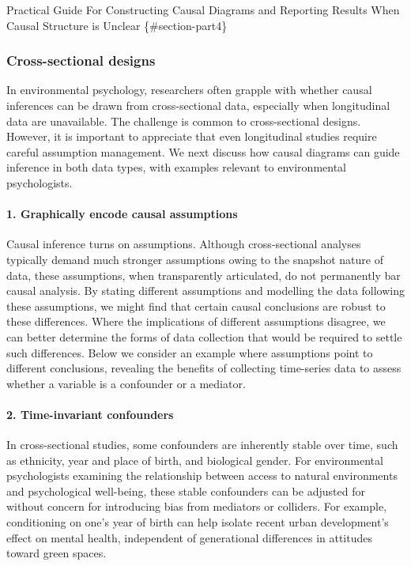 \documentclass[
  single column]{article}
\let\oldparagraph\paragraph
\renewcommand{\paragraph}[1]{\oldparagraph{#1}\mbox{}}
\begin{document}
Practical Guide For Constructing Causal Diagrams and Reporting Results
When Causal Structure is Unclear \{\#section-part4\}

\subsubsection{Cross-sectional designs}\label{cross-sectional-designs}

In environmental psychology, researchers often grapple with whether
causal inferences can be drawn from cross-sectional data, especially
when longitudinal data are unavailable. The challenge is common to
cross-sectional designs. However, it is important to appreciate that
even longitudinal studies require careful assumption management. We next
discuss how causal diagrams can guide inference in both data types, with
examples relevant to environmental psychologists.

\paragraph{1. Graphically encode causal
assumptions}\label{graphically-encode-causal-assumptions}

Causal inference turns on assumptions. Although cross-sectional analyses
typically demand much stronger assumptions owing to the snapshot nature
of data, these assumptions, when transparently articulated, do not
permanently bar causal analysis. By stating different assumptions and
modelling the data following these assumptions, we might find that
certain causal conclusions are robust to these differences. Where the
implications of different assumptions disagree, we can better determine
the forms of data collection that would be required to settle such
differences. Below we consider an example where assumptions point to
different conclusions, revealing the benefits of collecting time-series
data to assess whether a variable is a confounder or a mediator.

\paragraph{2. Time-invariant
confounders}\label{time-invariant-confounders}

In cross-sectional studies, some confounders are inherently stable over
time, such as ethnicity, year and place of birth, and biological gender.
For environmental psychologists examining the relationship between
access to natural environments and psychological well-being, these
stable confounders can be adjusted for without concern for introducing
bias from mediators or colliders. For example, conditioning on one's
year of birth can help isolate recent urban development's effect on
mental health, independent of generational differences in attitudes
toward green spaces.
\end{document}
